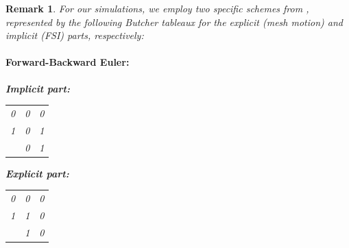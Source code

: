 \documentclass{article}
\newtheorem{remark}[theorem]{Remark}
\begin{document}
\begin{remark}
For our simulations, we employ two specific schemes from \cite{ascher1997implicit}, represented by the following Butcher tableaux for the explicit (mesh motion) and implicit (FSI) parts, respectively:
\paragraph{Forward-Backward Euler:}
\begin{center}
\begin{minipage}{0.45\textwidth}
\centering
\textbf{Implicit part:}
\begin{tabular}{c|cc}
    0 & 0 & 0\\
  1 & 0 & 1\\
  \hline
    & 0 & 1 \\
\end{tabular}
\end{minipage}
\hfill
\begin{minipage}{0.45\textwidth}
\centering
\textbf{Explicit part:}
\begin{tabular}{c|cc}
  0 & 0 & 0\\
  1 & 1 & 0\\
  \hline
    & 1 & 0 \\
\end{tabular}
\end{minipage}
\end{center}

\end{remark}
\end{document}
